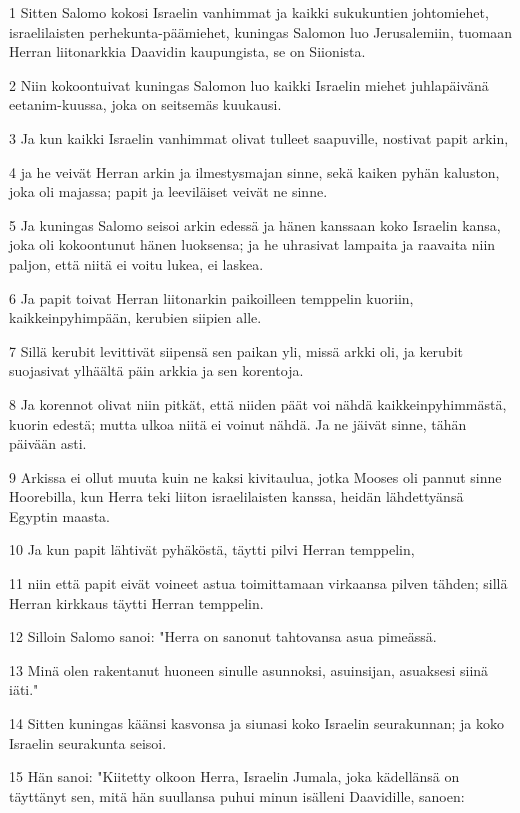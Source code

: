 \par 1 Sitten Salomo kokosi Israelin vanhimmat ja kaikki sukukuntien johtomiehet, israelilaisten perhekunta-päämiehet, kuningas Salomon luo Jerusalemiin, tuomaan Herran liitonarkkia Daavidin kaupungista, se on Siionista.
\par 2 Niin kokoontuivat kuningas Salomon luo kaikki Israelin miehet juhlapäivänä eetanim-kuussa, joka on seitsemäs kuukausi.
\par 3 Ja kun kaikki Israelin vanhimmat olivat tulleet saapuville, nostivat papit arkin,
\par 4 ja he veivät Herran arkin ja ilmestysmajan sinne, sekä kaiken pyhän kaluston, joka oli majassa; papit ja leeviläiset veivät ne sinne.
\par 5 Ja kuningas Salomo seisoi arkin edessä ja hänen kanssaan koko Israelin kansa, joka oli kokoontunut hänen luoksensa; ja he uhrasivat lampaita ja raavaita niin paljon, että niitä ei voitu lukea, ei laskea.
\par 6 Ja papit toivat Herran liitonarkin paikoilleen temppelin kuoriin, kaikkeinpyhimpään, kerubien siipien alle.
\par 7 Sillä kerubit levittivät siipensä sen paikan yli, missä arkki oli, ja kerubit suojasivat ylhäältä päin arkkia ja sen korentoja.
\par 8 Ja korennot olivat niin pitkät, että niiden päät voi nähdä kaikkeinpyhimmästä, kuorin edestä; mutta ulkoa niitä ei voinut nähdä. Ja ne jäivät sinne, tähän päivään asti.
\par 9 Arkissa ei ollut muuta kuin ne kaksi kivitaulua, jotka Mooses oli pannut sinne Hoorebilla, kun Herra teki liiton israelilaisten kanssa, heidän lähdettyänsä Egyptin maasta.
\par 10 Ja kun papit lähtivät pyhäköstä, täytti pilvi Herran temppelin,
\par 11 niin että papit eivät voineet astua toimittamaan virkaansa pilven tähden; sillä Herran kirkkaus täytti Herran temppelin.
\par 12 Silloin Salomo sanoi: "Herra on sanonut tahtovansa asua pimeässä.
\par 13 Minä olen rakentanut huoneen sinulle asunnoksi, asuinsijan, asuaksesi siinä iäti."
\par 14 Sitten kuningas käänsi kasvonsa ja siunasi koko Israelin seurakunnan; ja koko Israelin seurakunta seisoi.
\par 15 Hän sanoi: "Kiitetty olkoon Herra, Israelin Jumala, joka kädellänsä on täyttänyt sen, mitä hän suullansa puhui minun isälleni Daavidille, sanoen:
